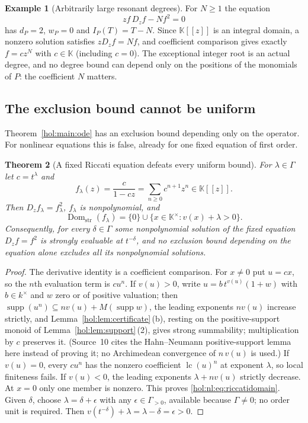 \documentclass[11pt]{article}
\numberwithin{equation}{section}
\newtheorem{theorem}{Theorem}[section]
\theoremstyle{definition}
\newtheorem{example}[theorem]{Example}
\theoremstyle{remark}
\newcommand{\supp}{\operatorname{supp}}
\newcommand{\lc}{\operatorname{lc}}
\newcommand{\Dom}{\operatorname{Dom}_{\mathrm{str}}}
\newcommand{\KK}{\mathbb K}
\begin{document}
\begin{example}[Arbitrarily large resonant degrees]\label{hol:nl:ex:resonant}
For $N\ge1$ the equation
\begin{equation}\label{hol:nl:eq:resonant}
 zf\,D_zf-Nf^2=0
\end{equation}
has $d_P=2$, $w_P=0$ and $I_P(T)=T-N$. Since $\KK[[z]]$ is an integral
domain, a nonzero solution satisfies $zD_zf=Nf$, and coefficient comparison
gives exactly $f=cz^N$ with $c\in\KK$ (including $c=0$). The exceptional
integer root is an actual degree, and no degree bound can depend only on the
positions of the monomials of $P$: the coefficient $N$ matters.
\end{example}

\subsection{The exclusion bound cannot be uniform}\label{hol:nl:sub:nouniform}

Theorem~\ref{hol:main:ode} has an exclusion bound depending only on the
operator. For nonlinear equations this is false, already for one fixed
equation of first order.

\begin{theorem}[A fixed Riccati equation defeats every uniform bound]
\label{hol:nl:thm:nouniform}
For $\lambda\in\Gamma$ let $c=t^\lambda$ and
\[
 f_\lambda(z)=\frac{c}{1-cz}=\sum_{n\ge0}c^{n+1}z^n\in\KK[[z]].
\]
Then $D_zf_\lambda=f_\lambda^2$, $f_\lambda$ is nonpolynomial, and
\begin{equation}\label{hol:nl:eq:riccatidomain}
 \Dom(f_\lambda)=\{0\}\cup\{x\in\KK^\times:v(x)+\lambda>0\}.
\end{equation}
Consequently, for every $\delta\in\Gamma$ some nonpolynomial solution of the
fixed equation $D_zf=f^2$ is strongly evaluable at $t^{-\delta}$, and no
exclusion bound depending on the equation alone excludes all its
nonpolynomial solutions.
\end{theorem}

\begin{proof}
The derivative identity is a coefficient comparison. For $x\ne0$ put $u=cx$,
so the $n$th evaluation term is $cu^n$. If $v(u)>0$, write
$u=b\,t^{v(u)}(1+w)$ with $b\in k^\times$ and $w$ zero or of positive
valuation; then $\supp(u^n)\subseteq nv(u)+M(\supp w)$, the leading exponents
$nv(u)$ increase strictly, and Lemma~\ref{hol:lem:certificate}\,(b), resting
on the positive-support monoid of Lemma~\ref{hol:lem:support}\,(2), gives
strong summability; multiplication by $c$ preserves it. (Source~10 cites the
Hahn--Neumann positive-support lemma here instead of proving it; no
Archimedean convergence of $n\,v(u)$ is used.) If $v(u)=0$, every $cu^n$ has
the nonzero coefficient $\lc(u)^n$ at exponent $\lambda$, so local finiteness
fails. If $v(u)<0$, the leading exponents $\lambda+nv(u)$ strictly decrease.
At $x=0$ only one member is nonzero. This proves
\eqref{hol:nl:eq:riccatidomain}. Given $\delta$, choose
$\lambda=\delta+\epsilon$ with any $\epsilon\in\Gamma_{>0}$, available
because $\Gamma\ne0$; no order unit is required. Then
$v(t^{-\delta})+\lambda=\lambda-\delta=\epsilon>0$.
\end{proof}
\end{document}
